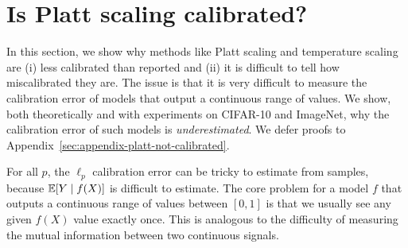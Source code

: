 \section{Is Platt scaling calibrated?}
\label{sec:challenges-measuring}

In this section, we show why methods like Platt scaling and temperature scaling are (i) less calibrated than reported and (ii) it is difficult to tell how miscalibrated they are. The issue is that it is very difficult to measure the calibration error of models that output a continuous range of values. We show, both theoretically and with experiments on CIFAR-10 and ImageNet, why the calibration error of such models is \emph{underestimated}. We defer proofs to Appendix~\ref{sec:appendix-platt-not-calibrated}.





For all $p$, the $\ell_p$ calibration error can be tricky to estimate from samples, because $\mathbb{E}[Y \mid f(X)]$ is difficult to estimate.
The core problem for a model $f$ that outputs a continuous range of values between $[0, 1]$ is that we usually see any given $f(X)$ value exactly once. This is analogous to the difficulty of measuring the mutual information between two continuous signals.

